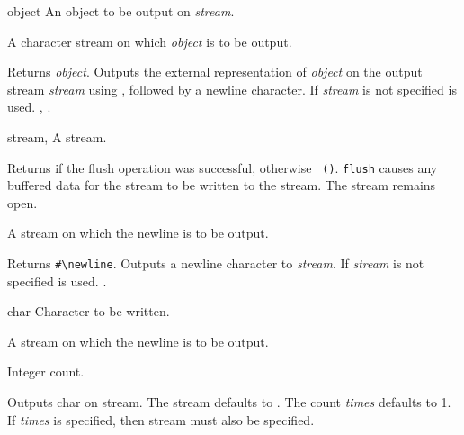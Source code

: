 \begin{optDefinition}
\begin{arguments}
    \item[object] An object to be output on {\em stream}.
    \item[\optional{stream}] A character stream on which {\em object\/} is
    to be output.
\end{arguments}
%
\result%
Returns {\em object}.
%
\remarks%
Outputs the external representation of {\em object\/} on the output
stream {\em stream\/} using , followed by a newline
character.  If {\em stream\/} is not specified  is used.
%
\seealso%
, .

\begin{genericargs}
    \item[stream, \classref{stream}] A stream.
\end{genericargs}
%
\result%
Returns \true\/ if the flush operation was successful, otherwise {\tt
    ()}.
%
\remarks%
{\tt flush} causes any buffered data for the stream to be written to
the stream. The stream remains open.

\begin{arguments}
    \item[\optional{stream}] A stream on which the newline is to be output.
\end{arguments}
%
\result%
Returns \verb|#\newline|.
%
\remarks%
Outputs a newline character to {\em stream}.  If {\em stream\/} is not
specified  is used.
%
\seealso%
.

\begin{arguments}
    \item[char] Character to be written.
    \item[\optional{stream}] A stream on which the newline is to be output.
    \item[\optional{times}] Integer count.
\end{arguments}
%
\result%
Outputs char on stream. The stream defaults to
. The count {\em times\/} defaults to 1.
%
\remarks%
If {\em times\/} is specified, then stream must also be specified.


\end{optDefinition}
